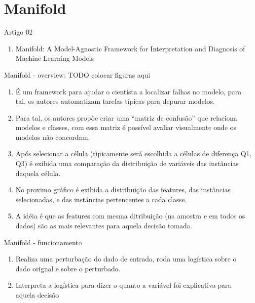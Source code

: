 \section{Manifold}

\begin{frame}
	\begin{block}{Artigo 02}
	\begin{enumerate}
		\item Manifold: A Model-Agnostic Framework for Interpretation and Diagnosis of Machine Learning Models
	\end{enumerate}
	\end{block}
\end{frame}


\begin{frame}
	\begin{block}{Manifold - overview: TODO colocar figuras aqui}
		\begin{enumerate}
			\item É um framework para ajudar o cientista a localizar falhas no modelo, para tal, os autores automatizam tarefas típicas para depurar modelos.
			\item Para tal, os autores propõe criar uma ``matriz de confusão'' que relaciona modelos e classes, com essa matriz é possível avaliar visualmente onde os modelos não concordam.
			\item Após selecionar a célula (tipicamente será escolhida a células de diferença Q1, Q3) é exibida uma comparação da distribuição de variáveis das instâncias daquela célula.
			\item No proximo gráfico é exibida a distribuição das features, das instâncias selecionadas, e das instâncias pertencentes a cada classe.
			\item A idéia é que as features com mesma ditribuição (na amostra e em todos os dados) são as mais relevantes para aquela decisão tomada.
		\end{enumerate}
	\end{block}
\end{frame}

\begin{frame}
	\begin{block}{Manifold - funcionamento}
		\begin{enumerate}
			\item Realiza uma perturbação do dado de entrada, roda uma logística sobre o dado orignal e sobre o perturbado.
			\item Interpreta a logística para dizer o quanto a variável foi explicativa para aquela decisão
		\end{enumerate}
	\end{block}
\end{frame}
